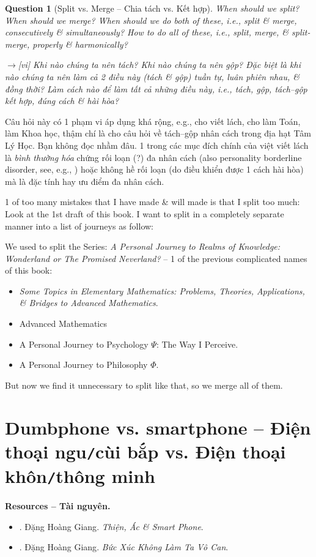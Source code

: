\documentclass[12pt,twoside]{book}
\newtheorem{question}{Question}
\begin{document}
\begin{question}[Split vs. Merge -- Chia tách vs. Kết hợp]
	When should we split? When should we merge? When should we do both of these, i.e., split \& merge, consecutively \& simultaneously? How to do all of these, i.e., split, merge, \& split-merge, properly \& harmonically?
	
	{\sf[en]$\to$[vi]} Khi nào chúng ta nên tách? Khi nào chúng ta nên gộp? Đặc biệt là khi nào chúng ta nên làm cả 2 điều này (tách \& gộp) tuần tự, luân phiên nhau, \& đồng thời? Làm cách nào để làm tất cả những điều này, i.e., tách, gộp, tách--gộp kết hợp, đúng cách \& hài hòa?
\end{question}
Câu hỏi này có 1 phạm vi áp dụng khá rộng, e.g., cho viết lách, cho làm Toán, làm Khoa học, thậm chí là cho câu hỏi về tách--gộp nhân cách trong địa hạt Tâm Lý Học. Bạn không đọc nhầm đâu. 1 trong các mục đích chính của việt viết lách là {\it bình thường hóa} chứng rối loạn (?) đa nhân cách (also personality borderline disorder, see, e.g., \cite{APA_DSM5}) hoặc không hề rối loạn (do điều khiển được 1 cách hài hòa) mà là đặc tính hay ưu điểm đa nhân cách.

1 of too many mistakes that I have made \& will made is that I split too much: Look at the 1st draft of this book. I want to split in a completely separate manner into a list of journeys as follow:

We used to split the Series: {\it A Personal Journey to Realms of Knowledge: Wonderland or The Promised Neverland?} -- 1 of the previous complicated names of this book:
\begin{itemize}
	\item {\it Some Topics in Elementary Mathematics: Problems, Theories, Applications, \& Bridges to Advanced Mathematics}.
	\item Advanced Mathematics
	\item A Personal Journey to Psychology $\Psi$: The Way I Perceive.
	\item A Personal Journey to Philosophy $\Phi$.
\end{itemize}
But now we find it unnecessary to split like that, so we merge all of them.

\section{Dumbphone vs. smartphone -- Điện thoại ngu{\tt/}cùi bắp vs. Điện thoại khôn{\tt/}thông minh}
\textbf{\textsf{Resources -- Tài nguyên.}}
\begin{itemize}
	\item \cite{Giang_smartphone}. {\sc Đặng Hoàng Giang}. {\it Thiện, Ác \& Smart Phone}.
	\item \cite{Giang_buc_xuc}. {\sc Đặng Hoàng Giang}. {\it Bức Xúc Không Làm Ta Vô Can}.
\end{itemize}
\end{document}
